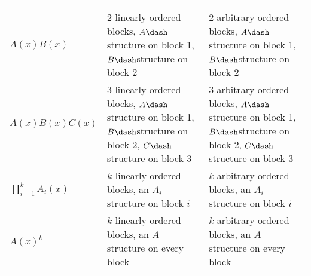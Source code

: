 \begin{longtable}[]{@{}lll@{}}
\begin{minipage}[t]{0.30\columnwidth}
\strut
\end{minipage}\tabularnewline
\begin{minipage}[t]{0.30\columnwidth}\raggedright
\(A(x)B(x)\)\strut
\end{minipage} & \begin{minipage}[t]{0.30\columnwidth}\raggedright
2 linearly ordered blocks, \(A\dash\)structure on block 1,
\(B\dash\)structure on block 2\strut
\end{minipage} & \begin{minipage}[t]{0.30\columnwidth}\raggedright
2 arbitrary ordered blocks, \(A\dash\)structure on block 1,
\(B\dash\)structure on block 2\strut
\end{minipage}\tabularnewline
\begin{minipage}[t]{0.30\columnwidth}\raggedright
\(A(x)B(x)C(x)\)\strut
\end{minipage} & \begin{minipage}[t]{0.30\columnwidth}\raggedright
3 linearly ordered blocks, \(A\dash\)structure on block 1,
\(B\dash\)structure on block 2, \(C\dash\)structure on block 3\strut
\end{minipage} & \begin{minipage}[t]{0.30\columnwidth}\raggedright
3 arbitrary ordered blocks, \(A\dash\)structure on block 1,
\(B\dash\)structure on block 2, \(C\dash\)structure on block 3\strut
\end{minipage}\tabularnewline
\begin{minipage}[t]{0.30\columnwidth}\raggedright
\(\displaystyle \prod_{i=1}^k A_i(x)\)\strut
\end{minipage} & \begin{minipage}[t]{0.30\columnwidth}\raggedright
\(k\) linearly ordered blocks, an \(A_i\) structure on block \(i\)\strut
\end{minipage} & \begin{minipage}[t]{0.30\columnwidth}\raggedright
\(k\) arbitrary ordered blocks, an \(A_i\) structure on block
\(i\)\strut
\end{minipage}\tabularnewline
\begin{minipage}[t]{0.30\columnwidth}\raggedright
\(A(x)^k\)\strut
\end{minipage} & \begin{minipage}[t]{0.30\columnwidth}\raggedright
\(k\) linearly ordered blocks, an \(A\) structure on every block\strut
\end{minipage} & \begin{minipage}[t]{0.30\columnwidth}\raggedright
\(k\) arbitrary ordered blocks, an \(A\) structure on every block\strut

\end{minipage}
\end{longtable}
